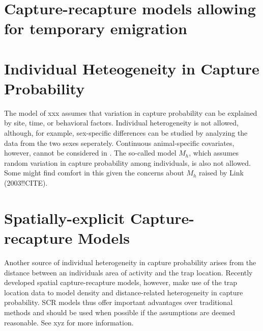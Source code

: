 \documentclass[a4paper]{article}
\begin{document}
\section{Capture-recapture models allowing for temporary emigration}



\section{Individual Heteogeneity in Capture Probability}

The model of xxx assumes that variation in capture probability can be
explained by site, time, or behavioral factors. Individual
heterogeneity is not allowed, although, for example, sex-specific
differences can be studied by analyzing the data from the two sexes
seperately. Continuous animal-specific covariates, however, cannot be
considered in . The so-called model $M_h$, which assumes
random variation in capture probability among individuals, is also not
allowed. Some might find comfort in this given the concerns about
$M_h$ raised by Link (2003!!CITE).





\section{Spatially-explicit Capture-recapture Models}

Another source of individual heterogeneity in capture probability
arises from the distance between an individuals area of activity and
the trap location.
Recently developed spatial capture-recapture models,
however, make use of the trap location data to model density and
distance-related heterogeneity in capture probability. SCR models thus
offer important advantages over traditional methods and should be used
when possible if the assumptions are deemed reasonable. See xyz for
more information.




\end{document}
